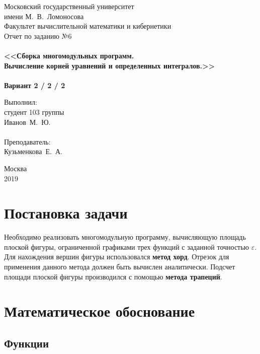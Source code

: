 \documentclass[a4paper,12pt,titlepage,finall]{article}
\begin{document}
\begin{titlepage}
    \begin{center}
	{\small \sc Московский государственный университет \\имени М.~В.~Ломоносова\\
	Факультет вычислительной математики и кибернетики\\}
	\vfill
	{\Large \sc Отчет по заданию №6}\\
	~\\
	{\large \bf <<Сборка многомодульных программ. \\
	Вычисление корней уравнений и определенных интегралов.>>}\\ 
	~\\
	{\large \bf Вариант 2 / 2 / 2}
    \end{center}
    \begin{flushright}
	\vfill {Выполнил:\\
	студент 103 группы\\
	Иванов~М.~Ю.\\
	~\\
	Преподаватель:\\
	Кузьменкова~Е.~А.}
    \end{flushright}
    \begin{center}
	\vfill
	{\small Москва\\2019}
    \end{center}
\end{titlepage}

\tableofcontents
\newpage

\section{Постановка задачи}

Необходимо реализовать многомодульную программу, вычисляющую площадь плоской фигуры, ограниченной графиками трех функций с заданной точностью $\varepsilon$. Для нахождения вершин фигуры использовался \textbf{метод хорд}. Отрезок для применения данного метода должен быть вычислен аналитически. Подсчет площади плоской фигуры производился с помощью \textbf{метода трапеций}.

\section{Математическое обоснование}

\subsection{Функции}
\end{document}
